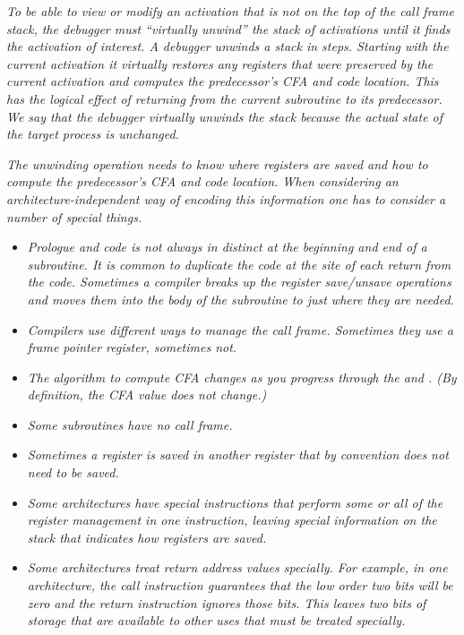 \textit{To be able to view or modify an activation that is not
on the top of the call frame stack, the debugger must
``virtually unwind'' the stack of activations until
it finds the activation of interest.  A debugger unwinds
a stack in steps. Starting with the current activation it
virtually restores any registers that were preserved by the
current activation and computes the predecessor\textquoteright s CFA and
code location. This has the logical effect of returning from
the current subroutine to its predecessor. We say that the
debugger virtually unwinds the stack because the actual state
of the target process is unchanged.}

\textit{The unwinding operation needs to know where registers are
saved and how to compute the predecessor\textquoteright s CFA and code
location. When considering an architecture-independent way
of encoding this information one has to consider a number of
special things.}


\begin{itemize} %

\item \textit{Prologue 
and 
 code is not always in 
distinct 
at the beginning and end of a subroutine. It is common
to duplicate the  code 
at the site of each return
from the code. Sometimes a compiler breaks up the register
save/unsave operations and moves them into the body of the
subroutine to just where they are needed.}


\item \textit{Compilers use different ways to manage the call
frame. Sometimes they use a frame pointer register, sometimes
not.}

\item \textit{The algorithm to compute CFA changes as you progress through
the  
and . 
(By definition, the CFA value
does not change.)}

\item \textit{Some subroutines have no call frame.}

\item \textit{Sometimes a register is saved in another register that by
convention does not need to be saved.}

\item \textit{Some architectures have special instructions that perform
some or all of the register management in one instruction,
leaving special information on the stack that indicates how
registers are saved.}

\item \textit{Some architectures treat return address values specially. For
example, in one architecture, the call instruction guarantees
that the low order two bits will be zero and the return
instruction ignores those bits. This leaves two bits of
storage that are available to other uses that must be treated
specially.}


\end{itemize}


